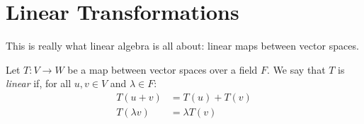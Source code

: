 \documentclass[../linear_algebra_and_groups.tex]{subfiles}
\begin{document}
\chapter{Linear Transformations}

This is really what linear algebra is all about: linear maps between vector spaces.

\begin{definition}
    \begin{shaded*}
        Let $T:V\to W$ be a map between vector spaces over a field $F$. We say that $T$ is \textit{linear} if, for all $u,v\in V$ and $\lambda\in F$:
        \begin{align*}
            T(u+v) &= T(u)+T(v) \\
            T(\lambda v) &= \lambda T(v)
        \end{align*}
    \end{shaded*}
\end{definition}
\end{document}
